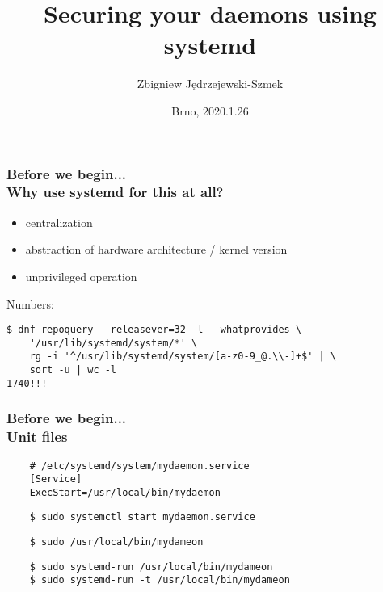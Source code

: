\documentclass[serif]{beamer}
\title[Systemd security features]{Securing your daemons using systemd}
\author{Zbigniew Jędrzejewski-Szmek}
\institute{%
  \texttt{[image: beamer-themeredhat/redhat.png]}\\
  \medskip
  \textit{zbyszek@in.waw.pl}\\
  \medskip
  \ccbysa
}
\date{\tiny Brno, 2020.1.26}
\begin{document}
\begin{frame}
\titlepage %
\end{frame}

\begin{frame}[fragile]
  \frametitle{Before we begin...\\Why use systemd for this at all?}

  \begin{itemize}
  \item centralization
  \item abstraction of hardware architecture / kernel version
  \item unprivileged operation
  \end{itemize}

  \pause
  \bigskip

  Numbers:
  \begin{verbatim}
$ dnf repoquery --releasever=32 -l --whatprovides \
    '/usr/lib/systemd/system/*' \
    rg -i '^/usr/lib/systemd/system/[a-z0-9_@.\\-]+$' | \
    sort -u | wc -l
1740!!!
  \end{verbatim}

\end{frame}

\begin{frame}[fragile]
  \frametitle{Before we begin...\\Unit files}

  \pause

  \begin{verbatim}
    # /etc/systemd/system/mydaemon.service
    [Service]
    ExecStart=/usr/local/bin/mydaemon
  \end{verbatim}
  \begin{verbatim}
    $ sudo systemctl start mydaemon.service
  \end{verbatim}

  \medskip
  \pause

  \begin{verbatim}
    $ sudo /usr/local/bin/mydameon
  \end{verbatim}

  \medskip
  \pause

  \begin{verbatim}
    $ sudo systemd-run /usr/local/bin/mydameon
    $ sudo systemd-run -t /usr/local/bin/mydameon
  \end{verbatim}
\end{frame}
\end{document}
